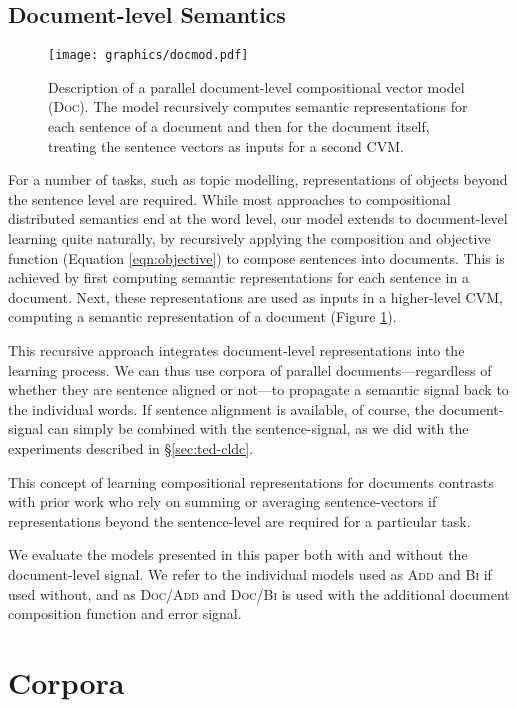 \documentclass[11pt]{article}
\newcommand{\addMod}{\textsc{Add}\xspace}
\newcommand{\flatMod}{\textsc{Bi}\xspace}
\newcommand{\docMod}{\textsc{Doc}\xspace}
\newcommand{\docModadd}{\textsc{Doc/Add}\xspace}
\newcommand{\docModflat}{\textsc{Doc/Bi}\xspace}
\newcommand{\CVM}{\textsc{CVM}\xspace}
\begin{document}
\subsection{Document-level Semantics}\label{sec:docmod}

\begin{figure}[t]\centering
  \captionsetup{font=small}
  \texttt{[image: graphics/docmod.pdf]}
  \caption{Description of a parallel document-level compositional vector model
    (\docMod). The model recursively computes semantic representations for each
    sentence of a document and then for the document itself, treating the sentence
    vectors as inputs for a second \CVM.
    }\label{fig:docmod}
\end{figure}

For a number of tasks, such as topic modelling, representations of objects beyond
the sentence level are required. While most approaches to compositional
distributed semantics end at the word level, our model extends to document-level
learning quite naturally, by recursively applying the composition and objective
function (Equation \ref{eqn:objective}) to compose sentences into documents.
This is achieved by first computing semantic representations for each sentence
in a document.  Next, these representations are used as inputs in a higher-level
\CVM, computing a semantic representation of a document (Figure
  \ref{fig:docmod}).

This recursive approach integrates document-level representations into the
learning process. We can thus use corpora of parallel documents---regardless of
whether they are sentence aligned or not---to propagate a semantic signal back
to the individual words.
If sentence alignment is available, of course, the document-signal can simply be
combined with the sentence-signal, as we did with the experiments described in
\S\ref{sec:ted-cldc}.

This concept of learning compositional representations for documents contrasts
with prior work \cite[\textit{inter alia}]{Socher:2011,Klementiev:2012} who rely
on summing or averaging sentence-vectors if representations beyond the
sentence-level are required for a particular task.

We evaluate the models presented in this paper both with and without the
document-level signal. We refer to the individual models used as \addMod and
\flatMod if used without, and as \docModadd and \docModflat is used with the
additional document composition function and error signal.
 \section{Corpora}\label{sec:corpus}
\end{document}
